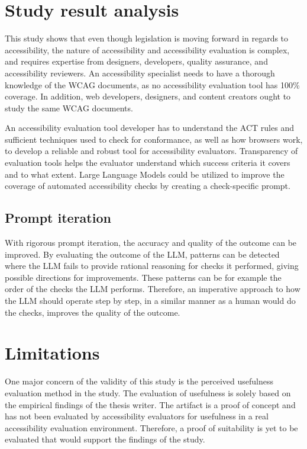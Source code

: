 \section{Study result analysis}

This study shows that even though legislation is moving forward in regards to accessibility, the nature of accessibility and accessibility evaluation is complex, and requires expertise from designers, developers, quality assurance, and accessibility reviewers. An accessibility specialist needs to have a thorough knowledge of the WCAG documents, as no accessibility evaluation tool has 100\% coverage. In addition, web developers, designers, and content creators ought to study the same WCAG documents. 

An accessibility evaluation tool developer has to understand the ACT rules and sufficient techniques used to check for conformance, as well as how browsers work, to develop a reliable and robust tool for accessibility evaluators. Transparency of evaluation tools helps the evaluator understand which success criteria it covers and to what extent. Large Language Models could be utilized to improve the coverage of automated accessibility checks by creating a check-specific prompt.

\subsection{Prompt iteration}

With rigorous prompt iteration, the accuracy and quality of the outcome can be improved. By evaluating the outcome of the LLM, patterns can be detected where the LLM fails to provide rational reasoning for checks it performed, giving possible directions for improvements. These patterns can be for example the order of the checks the LLM performs. Therefore, an imperative approach to how the LLM should operate step by step, in a similar manner as a human would do the checks, improves the quality of the outcome. 


\section{Limitations}

One major concern of the validity of this study is the perceived usefulness evaluation method in the study. The evaluation of usefulness is solely based on the empirical findings of the thesis writer. The artifact is a proof of concept and has not been evaluated by accessibility evaluators for usefulness in a real accessibility evaluation environment. Therefore, a proof of suitability is yet to be evaluated that would support the findings of the study.

